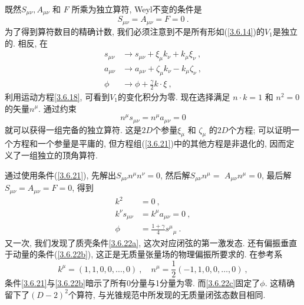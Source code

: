 既然$S_{\mu \nu}, A_{\mu \nu}$ 和 $F$ 所乘为独立算符, Weyl不变的条件是
\begin{equation}
S_{\mu \nu}=A_{\mu \nu}=F=0 \:.\label{3.6.19}
\end{equation}
为了得到算符数目的精确计数, 我们必须注意到不是所有形如(\ref{3.6.14})的$V_1$是独立的. 相反, 在
\begin{subequations}\label{3.6.20}
\begin{align}
s_{\mu \nu} &\rightarrow s_{\mu \nu}+\xi_{\mu} k_{\nu}+k_{\mu} \xi_{\nu} \:, \label{3.6.20a} \\
a_{\mu \nu} &\rightarrow a_{\mu \nu}+\zeta_{\mu} k_{\nu}-k_{\mu} \zeta_{\nu} \:, \label{3.6.20b} \\
\phi &\rightarrow \phi+\frac{\gamma}{2} k \cdot \xi \:, \label{3.6.20c}
\end{align}
\end{subequations}
利用运动方程\eqref{3.6.18}, 可看到$V_1$的变化积分为零. 现在选择满足 $n \cdot k=1$ 和 $n^{2}=0$的矢量$n^{\mu}$. 通过约束
\begin{equation}\label{3.6.21}
n^{\mu} s_{\mu \nu}=n^{\mu} a_{\mu \nu}=0
\end{equation}
就可以获得一组完备的独立算符. 这是$2D$个参量$\xi_{\mu}$ 和 $\zeta_{\mu}$ 的$2D$个方程; 可以证明一个方程和一个参量是平庸的, 但方程组(\ref{3.6.21})中的其他方程是非退化的, 因而定义了一组独立的顶角算符.

通过使用条件(\ref{3.6.21}), 先解出$S_{\mu \nu} n^{\mu} n^{\nu}=0$, 然后解$S_{\mu \nu} n^{\mu}=$ $A_{\mu \nu} n^{\mu}=0$, 最后解$S_{\mu \nu}=A_{\mu \nu}=F=0$, 得到
\begin{subequations}  \label{3.6.22}
\begin{align}
k^{2}&=0 \:, \label{3.6.22a} \\
k^{\nu} s_{\mu \nu}&=k^{\mu} a_{\mu \nu}=0 \:, \label{3.6.22b} \\
\phi&=\frac{1+\gamma}{4} s^{\mu}{}_{\mu} \:. \label{3.6.22c}
\end{align}
\end{subequations}
又一次, 我们发现了质壳条件\eqref{3.6.22a}, 这次对应闭弦的第一激发态. 还有偏振垂直于动量的条件(\ref{3.6.22b}), 这正是无质量张量场的物理偏振所要求的. 在参考系
\begin{equation}
k^{\mu}=(1,1,0,0, \ldots, 0) \: , \quad n^{\mu}=\frac{1}{2}(-1,1,0,0, \ldots, 0) \:, \label{3.6.23}
\end{equation}
条件\eqref{3.6.21}与\eqref{3.6.22b}暗示了所有0分量与1分量为零. 而\eqref{3.6.22c}固定了$\phi$. 这精确留下了$(D-2)^2$个算符, 与光锥规范中所发现的无质量闭弦态数目相同.

